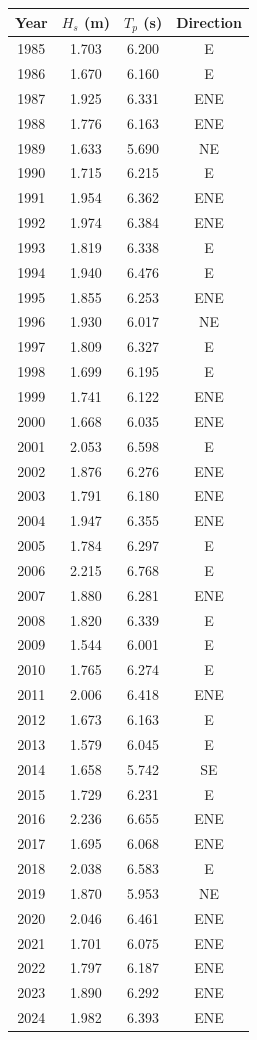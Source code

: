 \begin{tabular}{cccc}
\hline
Year & $H_s$ (m) & $T_p$ (s) & Direction \\
\hline
1985 & 1.703 & 6.200 & E \\
1986 & 1.670 & 6.160 & E \\
1987 & 1.925 & 6.331 & ENE \\
1988 & 1.776 & 6.163 & ENE \\
1989 & 1.633 & 5.690 & NE \\
1990 & 1.715 & 6.215 & E \\
1991 & 1.954 & 6.362 & ENE \\
1992 & 1.974 & 6.384 & ENE \\
1993 & 1.819 & 6.338 & E \\
1994 & 1.940 & 6.476 & E \\
1995 & 1.855 & 6.253 & ENE \\
1996 & 1.930 & 6.017 & NE \\
1997 & 1.809 & 6.327 & E \\
1998 & 1.699 & 6.195 & E \\
1999 & 1.741 & 6.122 & ENE \\
2000 & 1.668 & 6.035 & ENE \\
2001 & 2.053 & 6.598 & E \\
2002 & 1.876 & 6.276 & ENE \\
2003 & 1.791 & 6.180 & ENE \\
2004 & 1.947 & 6.355 & ENE \\
2005 & 1.784 & 6.297 & E \\
2006 & 2.215 & 6.768 & E \\
2007 & 1.880 & 6.281 & ENE \\
2008 & 1.820 & 6.339 & E \\
2009 & 1.544 & 6.001 & E \\
2010 & 1.765 & 6.274 & E \\
2011 & 2.006 & 6.418 & ENE \\
2012 & 1.673 & 6.163 & E \\
2013 & 1.579 & 6.045 & E \\
2014 & 1.658 & 5.742 & SE \\
2015 & 1.729 & 6.231 & E \\
2016 & 2.236 & 6.655 & ENE \\
2017 & 1.695 & 6.068 & ENE \\
2018 & 2.038 & 6.583 & E \\
2019 & 1.870 & 5.953 & NE \\
2020 & 2.046 & 6.461 & ENE \\
2021 & 1.701 & 6.075 & ENE \\
2022 & 1.797 & 6.187 & ENE \\
2023 & 1.890 & 6.292 & ENE \\
2024 & 1.982 & 6.393 & ENE \\
\hline
\end{tabular}

